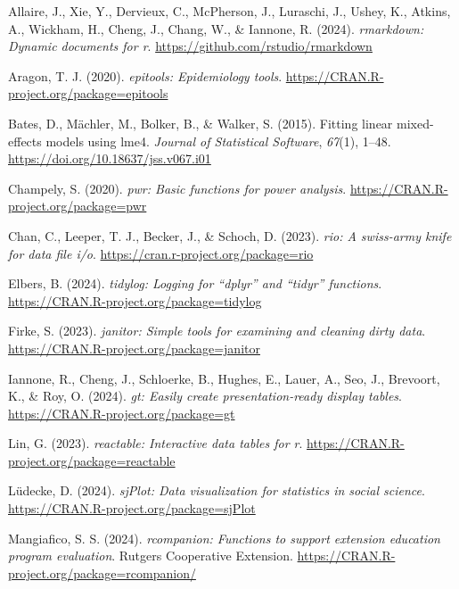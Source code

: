 \documentclass[
  letterpaper,
  DIV=11,
  numbers=noendperiod]{scrartcl}
\newlength{\cslhangindent}
\newenvironment{CSLReferences}[2] %
 {\begin{list}{}{%
  \setlength{\itemindent}{0pt}
  \setlength{\leftmargin}{0pt}
  \setlength{\parsep}{0pt}
  \ifodd #1
   \setlength{\leftmargin}{\cslhangindent}
   \setlength{\itemindent}{-1\cslhangindent}
  \fi
  \setlength{\itemsep}{#2\baselineskip}}}
 {\end{list}}
\begin{document}
\label{refs}
\begin{CSLReferences}{1}{0}
Allaire, J., Xie, Y., Dervieux, C., McPherson, J., Luraschi, J., Ushey,
K., Atkins, A., Wickham, H., Cheng, J., Chang, W., \& Iannone, R.
(2024). \emph{{rmarkdown}: Dynamic documents for r}.
\url{https://github.com/rstudio/rmarkdown}

Aragon, T. J. (2020). \emph{{epitools}: Epidemiology tools}.
\url{https://CRAN.R-project.org/package=epitools}

Bates, D., Mächler, M., Bolker, B., \& Walker, S. (2015). Fitting linear
mixed-effects models using {lme4}. \emph{Journal of Statistical
Software}, \emph{67}(1), 1--48.
\url{https://doi.org/10.18637/jss.v067.i01}

Champely, S. (2020). \emph{{pwr}: Basic functions for power analysis}.
\url{https://CRAN.R-project.org/package=pwr}

Chan, C., Leeper, T. J., Becker, J., \& Schoch, D. (2023). \emph{{rio}:
A swiss-army knife for data file i/o}.
\url{https://cran.r-project.org/package=rio}

Elbers, B. (2024). \emph{{tidylog}: Logging for {``{dplyr}''} and
{``{tidyr}''} functions}.
\url{https://CRAN.R-project.org/package=tidylog}

Firke, S. (2023). \emph{{janitor}: Simple tools for examining and
cleaning dirty data}. \url{https://CRAN.R-project.org/package=janitor}

Iannone, R., Cheng, J., Schloerke, B., Hughes, E., Lauer, A., Seo, J.,
Brevoort, K., \& Roy, O. (2024). \emph{{gt}: Easily create
presentation-ready display tables}.
\url{https://CRAN.R-project.org/package=gt}

Lin, G. (2023). \emph{{reactable}: Interactive data tables for r}.
\url{https://CRAN.R-project.org/package=reactable}

Lüdecke, D. (2024). \emph{{sjPlot}: Data visualization for statistics in
social science}. \url{https://CRAN.R-project.org/package=sjPlot}

Mangiafico, S. S. (2024). \emph{{rcompanion}: Functions to support
extension education program evaluation}. Rutgers Cooperative Extension.
\url{https://CRAN.R-project.org/package=rcompanion/}


\end{CSLReferences}
\end{document}
